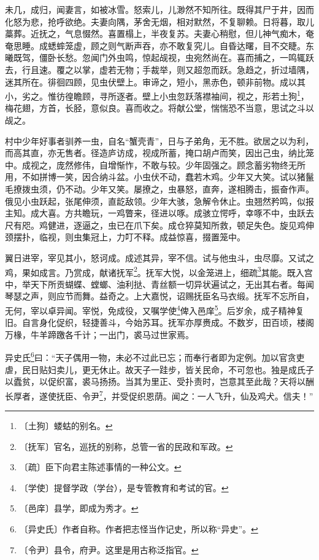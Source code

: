 \documentclass[12pt,UTF-8,openany,a4]{ctexbook}
\begin{document}
\begin{large}
    未几，成归，闻妻言，如被冰雪。怒索儿，儿渺然不知所往。既得其尸于井，因而化怒为悲，抢呼欲绝。夫妻向隅，茅舍无烟，相对默然，不复聊赖。日将暮，取儿藁葬。近抚之，气息惙然。喜置榻上，半夜复苏。夫妻心稍慰，但儿神气痴木，奄奄思睡。成蟋蟀笼虚，顾之则气断声吞，亦不敢复究儿。自昏达曙，目不交睫。东曦既驾，僵卧长愁。忽闻门外虫鸣，惊起觇视，虫宛然尚在。喜而捕之，一鸣辄跃去，行且速。覆之以掌，虚若无物；手裁举，则又超忽而跃。急趋之，折过墙隅，迷其所在。徘徊四顾，见虫伏壁上。审谛之，短小，黑赤色，顿非前物。成以其小，劣之。惟彷徨瞻顾，寻所逐者。壁上小虫忽跃落襟袖间，视之，形若土狗\footnote{〔土狗〕\yiwen 蝼蛄的别名。}，梅花翅，方首，长胫，意似良。喜而收之。将献公堂，惴惴恐不当意，思试之斗以觇之。
    
    村中少年好事者驯养一虫，自名“蟹壳青”，日与子弟角，无不胜。欲居之以为利，而高其直，亦无售者。径造庐访成，视成所蓄，掩口胡卢而笑，因出己虫，纳比笼中。成视之，庞然修伟，自增惭怍，不敢与较。少年固强之。顾念蓄劣物终无所用，不如拼博一笑，因合纳斗盆。小虫伏不动，蠢若木鸡。少年又大笑。试以猪鬣毛撩拨虫须，仍不动。少年又笑。屡撩之，虫暴怒，直奔，遂相腾击，振奋作声。俄见小虫跃起，张尾伸须，直龁敌领。少年大骇，急解令休止。虫翘然矜鸣，似报主知。成大喜。方共瞻玩，一鸡瞥来，径进以啄。成骇立愕呼，幸啄不中，虫跃去尺有咫。鸡健进，逐逼之，虫已在爪下矣。成仓猝莫知所救，顿足失色。旋见鸡伸颈摆扑，临视，则虫集冠上，力叮不释。成益惊喜，掇置笼中。
    
    翼日进宰，宰见其小，怒诃成。成述其异，宰不信。试与他虫斗，虫尽靡。又试之鸡，果如成言。乃赏成，献诸抚军\footnote{〔抚军〕\yiwen 官名，巡抚的别称，总管一省的民政和军政。}。抚军大悦，以金笼进上，细疏\footnote{〔疏〕\yiwen 臣下向君主陈述事情的一种公文。}其能。既入宫中，举天下所贡蝴蝶、螳螂、油利挞、青丝额一切异状遍试之，无出其右者。每闻琴瑟之声，则应节而舞。益奇之。上大嘉悦，诏赐抚臣名马衣缎。抚军不忘所自，无何，宰以卓异闻。宰悦，免成役，又嘱学使\footnote{〔学使〕\yiwen 提督学政（学台），是专管教育和考试的官。}俾入邑庠\footnote{〔邑庠〕\yiwen 县学，即成为秀才。}。后岁余，成子精神复旧。自言身化促织，轻捷善斗，今始苏耳。抚军亦厚赉成。不数岁，田百顷，楼阁万椽，牛羊蹄躈各千计；一出门，裘马过世家焉。
    
    异史氏\footnote{〔异史氏〕\yiwen 作者自称。作者把志怪当作记史，所以称“异史”。}曰：“天子偶用一物，未必不过此已忘；而奉行者即为定例。加以官贪吏虐，民日贴妇卖儿，更无休止。故天子一跬步，皆关民命，不可忽也。独是成氏子以蠹贫，以促织富，裘马扬扬。当其为里正、受扑责时，岂意其至此哉？天将以酬长厚者，遂使抚臣、令尹\footnote{〔令尹〕\yiwen 县令，府尹。这里是用古称泛指官。}，并受促织恩荫。闻之：一人飞升，仙及鸡犬。信夫！”
\end{large}
\end{document}
